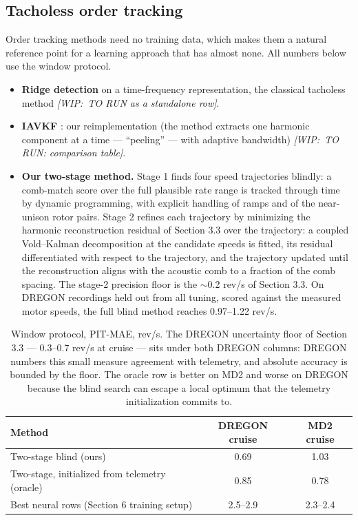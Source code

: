 \documentclass[journal]{IEEEtran}
\newcommand{\wip}[1]{{\color{gray!70!black}\textit{[WIP:~#1]}}}
\begin{document}
\subsection{Tacholess order tracking}
\label{sec:order-tracking}

Order tracking methods need no training data, which makes them a natural
reference point for a learning approach that has almost none. All numbers
below use the window protocol.

\begin{itemize}
\item \textbf{Ridge detection} on a time-frequency representation, the
  classical tacholess method \wip{TO RUN as a standalone row}.
\item \textbf{IAVKF} \cite{jiang2024iavkf}: our reimplementation (the method
  extracts one harmonic component at a time --- ``peeling'' --- with adaptive
  bandwidth) \wip{TO RUN: comparison table}.
\item \textbf{Our two-stage method.} Stage 1 finds four speed trajectories
  blindly: a comb-match score over the full plausible rate range is tracked
  through time by dynamic programming, with explicit handling of ramps and of
  the near-unison rotor pairs. Stage 2 refines each trajectory by minimizing
  the harmonic reconstruction residual of Section 3.3 over the trajectory: a
  coupled Vold--Kalman decomposition at the candidate speeds is fitted, its
  residual differentiated with respect to the trajectory, and the trajectory
  updated until the reconstruction aligns with the acoustic comb to a
  fraction of the comb spacing. The stage-2 precision floor is the
  $\sim$0.2 rev/s of Section 3.3. On DREGON recordings held out from all
  tuning, scored against the measured motor speeds, the full blind method
  reaches 0.97--1.22 rev/s.
\end{itemize}

\begin{table}[t]
  \centering
  \caption{Window protocol, PIT-MAE, rev/s. The DREGON uncertainty floor of
    Section 3.3 --- 0.3--0.7 rev/s at cruise --- sits under both DREGON
    columns: DREGON numbers this small measure agreement with telemetry, and
    absolute accuracy is bounded by the floor. The oracle row is better on
    MD2 and worse on DREGON because the blind search can escape a local
    optimum that the telemetry initialization commits to.}
  \label{tab:order-tracking}
  \footnotesize
  \setlength{\tabcolsep}{4pt}
  \begin{tabular}{@{}p{}cc@{}}
    \toprule
    Method & DREGON cruise & MD2 cruise \\
    \midrule
    Two-stage blind (ours) & 0.69 & 1.03 \\
    Two-stage, initialized from telemetry (oracle) & 0.85 & 0.78 \\
    Best neural rows (Section 6 training setup) & 2.5--2.9 & 2.3--2.4 \\
    \bottomrule
  \end{tabular}
\end{table}
\end{document}
